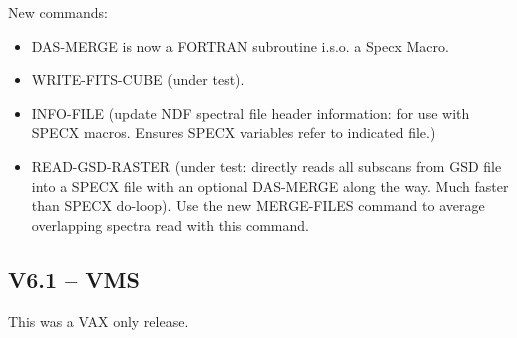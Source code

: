 \documentclass[twoside,11pt]{article}
\renewcommand{\_}{\texttt{\symbol{95}}}
\begin{document}
New commands:
\begin{itemize}
\item DAS-MERGE is now a FORTRAN subroutine i.s.o. a Specx Macro.

\item WRITE-FITS-CUBE (under test).

\item INFO-FILE  (update NDF spectral file header information: for
         use with SPECX macros. Ensures SPECX variables refer to
         indicated file.)

\item READ-GSD-RASTER (under test: directly reads all subscans
         from GSD file into a SPECX file with an optional DAS-MERGE
         along the way. Much faster than SPECX do-loop). Use the
         new MERGE-FILES command to average overlapping spectra
         read with this command.

\end{itemize}

\subsection{V6.1 -- VMS}

This was a VAX only release.
\end{document}
